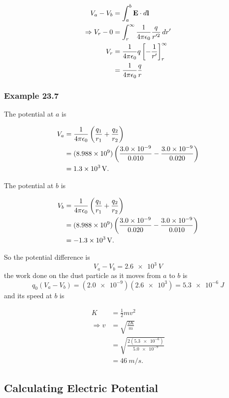 \documentclass{article}
\begin{document}
\begin{align*}
  V_a - V_b           & = \int_a^b \mathbf{E} \cdot d\mathbf{l}       \\
  \Rightarrow V_r - 0 & = \int_r^\infty \frac{1}{4 \pi \epsilon_0} \frac{q}{r'^2} \,dr'      \\
  V_r                 & = \frac{1}{4 \pi \epsilon_0} q \left[ -\frac{1}{r'} \right]_r^\infty \\
                      & = \frac{1}{4 \pi \epsilon_0} \frac{q}{r}
\end{align*}

\subsubsection{Example 23.7}

The potential at $a$ is

\begin{align*}
  V_a & = \frac{1}{4 \pi \epsilon_0} \left( \frac{q_1}{r_1} + \frac{q_2}{r_2} \right)                                  \\
      & = (\num{8.988e9})\left( \frac{\num{3.0e-9}}{0.010} - \frac{\num{3.0e-9}}{0.020} \right) \\
      & = \qty{1.3e3}{V}.
\end{align*}

The potential at $b$ is

\begin{align*}
  V_b & = \frac{1}{4 \pi \epsilon_0} \left( \frac{q_1}{r_1} + \frac{q_2}{r_2} \right)                                  \\
      & = (\num{8.988e9})\left( \frac{\num{3.0e-9}}{0.020} - \frac{\num{3.0e-9}}{0.010} \right) \\
      & = \qty{-1.3e3}{V}.
\end{align*}

So the potential difference is \[V_a - V_b = \qty{2.6e3}{V}\] the work done on the dust particle as it moves from $a$ to $b$ is \[q_0 (V_a - V_b) = (\num{2.0e-9})(\num{2.6e3}) = \qty{5.3e-6}{J}\] and its speed at $b$ is

\begin{align*}
  K             & = \frac{1}{2} m v^2                            \\
  \Rightarrow v & = \sqrt{\frac{2 K}{m}}                         \\
                & = \sqrt{\frac{2 (\num{5.3e-6})}{\num{5.0e-9}}} \\
                & = \qty{46}{m/s}.
\end{align*}

\subsection{Calculating Electric Potential}
\end{document}
